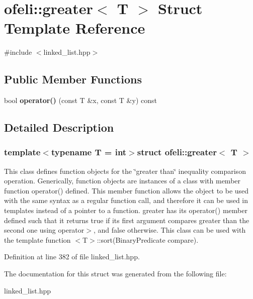 \hypertarget{structofeli_1_1greater}{\section{ofeli\-:\-:greater$<$ T $>$ Struct Template Reference}
\label{structofeli_1_1greater}
}


{\ttfamily \#include $<$linked\-\_\-list.\-hpp$>$}

\subsection*{Public Member Functions}
\begin{DoxyCompactItemize}
\item 
\hypertarget{structofeli_1_1greater_a9aaddf2c494e306c8c6d823d8b2dacf0}{bool {\bfseries operator()} (const T \&x, const T \&y) const }\label{structofeli_1_1greater_a9aaddf2c494e306c8c6d823d8b2dacf0}

\end{DoxyCompactItemize}


\subsection{Detailed Description}
\subsubsection*{template$<$typename T = int$>$struct ofeli\-::greater$<$ T $>$}

This class defines function objects for the \char`\"{}greater than\char`\"{} inequality comparison operation. Generically, function objects are instances of a class with member function {\ttfamily operator()} defined. This member function allows the object to be used with the same syntax as a regular function call, and therefore it can be used in templates instead of a pointer to a function. {\ttfamily greater} has its {\ttfamily operator()} member defined such that it returns {\ttfamily true} if its first argument compares greater than the second one using {\ttfamily operator$>$}, and {\ttfamily false} otherwise. This class can be used with the template function $<$\-T$>$\-::sort(\-Binary\-Predicate compare). 

Definition at line 382 of file linked\-\_\-list.\-hpp.



The documentation for this struct was generated from the following file\-:\begin{DoxyCompactItemize}
\item 
linked\-\_\-list.\-hpp\end{DoxyCompactItemize}
